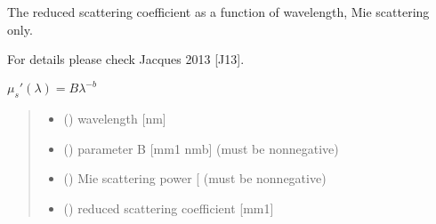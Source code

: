 \documentclass[letterpaper,10pt,english]{sphinxmanual}
\begin{document}

\begin{fulllineitems}
\label{\detokenize{04_scattering_coefficient:skinoptics.scattering_coefficient.rmus_Mie}}
\pysigstartsignatures
{}
\pysigstopsignatures
\begin{DUlineblock}{0em}
\item[] The reduced scattering coefficient as a function of wavelength, Mie scattering only.
\item[] For details please check Jacques 2013 {[}J13{]}.
\end{DUlineblock}

\sphinxAtStartPar
\(\mu_s'(\lambda) = B \lambda^{-b}\)
\begin{quote}\begin{description}
\begin{itemize}
\item {} 
\sphinxAtStartPar
{} () \textendash{} wavelength {[}nm{]}

\item {} 
\sphinxAtStartPar
{} () \textendash{} parameter B {[}mm\sphinxhyphen{}1 nmb{]} (must be nonnegative)

\item {} 
\sphinxAtStartPar
{} () \textendash{} Mie scattering power {[}\sphinxhyphen{}{]} (must be nonnegative)

\end{itemize}

\sphinxAtStartPar
\begin{itemize}
\item {} 
\sphinxAtStartPar
{} () \textendash{} reduced scattering coefficient {[}mm\sphinxhyphen{}1{]}

\end{itemize}


\end{description}\end{quote}

\end{fulllineitems}
\end{document}
